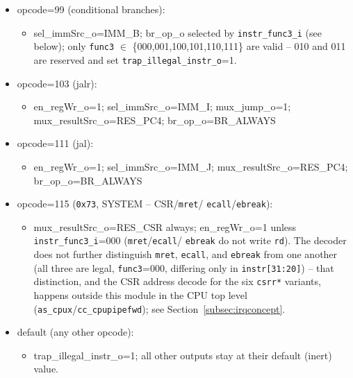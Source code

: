 \begin{itemize}
\begin{itemize}
\begin{itemize}
      \item opcode=99 (conditional branches):
      \begin{itemize}
        \item sel\_immSrc\_o=IMM\_B; br\_op\_o selected by
          \texttt{instr\_func3\_i} (see below); only \texttt{func3}
          $\in$ \{000,001,100,101,110,111\} are valid -- 010 and 011 are
          reserved and set \texttt{trap\_illegal\_instr\_o}=1.
      \end{itemize}
      \item opcode=103 (jalr):
      \begin{itemize}
        \item en\_regWr\_o=1; sel\_immSrc\_o=IMM\_I; mux\_jump\_o=1;
          mux\_resultSrc\_o=RES\_PC4; br\_op\_o=BR\_ALWAYS
      \end{itemize}
      \item opcode=111 (jal):
      \begin{itemize}
        \item en\_regWr\_o=1; sel\_immSrc\_o=IMM\_J; mux\_resultSrc\_o=RES\_PC4;
          br\_op\_o=BR\_ALWAYS
      \end{itemize}
      \item opcode=115 (\texttt{0x73}, SYSTEM -- CSR/\texttt{mret}/
        \texttt{ecall}/\texttt{ebreak}):
      \begin{itemize}
        \item mux\_resultSrc\_o=RES\_CSR always; en\_regWr\_o=1 unless
          \texttt{instr\_func3\_i}=000 (\texttt{mret}/\texttt{ecall}/
          \texttt{ebreak} do not write \texttt{rd}). The decoder does not
          further distinguish \texttt{mret}, \texttt{ecall}, and
          \texttt{ebreak} from one another (all three are legal,
          \texttt{func3}=000, differing only in \texttt{instr[31:20]}) --
          that distinction, and the CSR address decode for the six
          \texttt{csrr*} variants, happens outside this module in the CPU
          top level (\texttt{as\_cpux}/\texttt{cc\_cpupipefwd}); see
          Section~\ref{subsec:irqconcept}.
      \end{itemize}
      \item default (any other opcode):
      \begin{itemize}
        \item trap\_illegal\_instr\_o=1; all other outputs stay at their
          default (inert) value.
      \end{itemize}
    \end{itemize}

\end{itemize}
\end{itemize}
